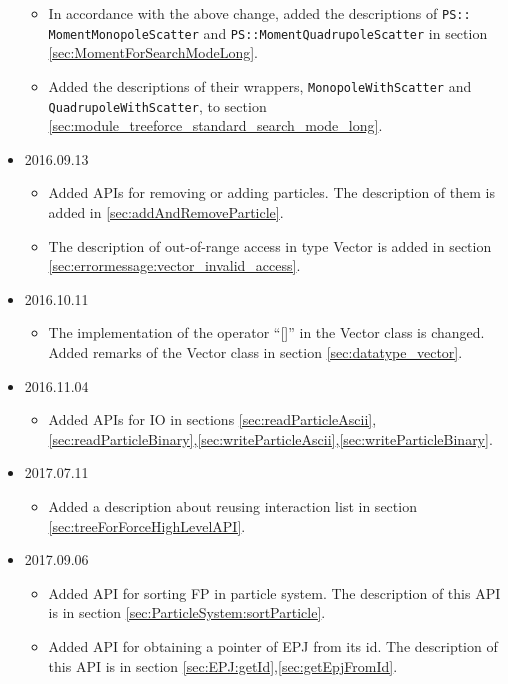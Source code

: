 \begin{itemize}
\begin{itemize}
  \item In accordance with the above change, added the descriptions of 
    \texttt{PS:: MomentMonopoleScatter} and
    \texttt{PS::MomentQuadrupoleScatter} in 
    section  \ref{sec:MomentForSearchModeLong}.

  \item Added the descriptions of their wrappers,
    \texttt{MonopoleWithScatter} 
    and 
    \texttt{QuadrupoleWithScatter},
    to section  \ref{sec:module_treeforce_standard_search_mode_long}.

  \end{itemize}


  \item 2016.09.13
  \begin{itemize}
  \item Added APIs for removing or adding particles. The description
    of them is added in \ref{sec:addAndRemoveParticle}.
  \item The description of out-of-range access in type Vector is added
    in section \ref{sec:errormessage:vector_invalid_access}.
  \end{itemize}

    \item 2016.10.11
  \begin{itemize}
  \item The implementation of the operator ``[]'' in the Vector class
    is changed. Added remarks of the Vector class in section \ref{sec:datatype_vector}.
  \end{itemize}

  \item 2016.11.04
  \begin{itemize}
  \item Added APIs for IO in sections
    \ref{sec:readParticleAscii},\ref{sec:readParticleBinary},\ref{sec:writeParticleAscii},\ref{sec:writeParticleBinary}.
  \end{itemize}

    \item 2017.07.11
  \begin{itemize}
  \item Added a description about reusing interaction list in section
    \ref{sec:treeForForceHighLevelAPI}.
  \end{itemize}

    \item 2017.09.06
  \begin{itemize}
  \item Added API for sorting FP in particle system. The description of this API is in section
    \ref{sec:ParticleSystem:sortParticle}.
  \item Added API for obtaining a pointer of EPJ from its id. The
    description of this API is in section
    \ref{sec:EPJ:getId},\ref{sec:getEpjFromId}.
  \end{itemize}


\end{itemize}
